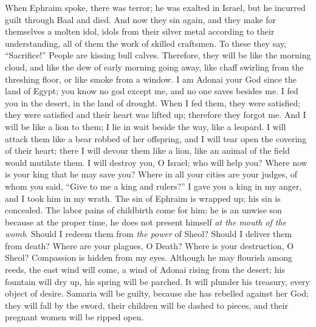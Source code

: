 \begin{biblechapter} %
 When Ephraim spoke, there was terror; 
he was exalted in Israel, 
but he incurred guilt through Baal and died.
\verse And now they sin again, 
and they make for themselves a molten idol, 
idols from their silver metal according to their understanding, 
all of them the work of skilled craftsmen. 
To these they say, “Sacrifice!” 
People are kissing bull calves.
\verse Therefore, they will be like the morning cloud, 
and like the dew of early morning going away, 
like chaff swirling from the threshing floor, 
or like smoke from a window.
\verse I am Adonai your God 
since the land of Egypt; 
you know no god except me, 
and no one saves besides me.
\verse I fed you in the desert, 
in the land of drought.
\verse When I fed them, they were satisfied; 
they were satisfied and their heart was lifted up; 
therefore they forgot me.
\verse And I will be like a lion to them; 
I lie in wait beside the way, like a leopard.
\verse I will attack them like a bear robbed of her offspring, 
and I will tear open the covering of their heart; 
there I will devour them like a lion, 
like an animal of the field would mutilate them.
\verse I will destroy you, O Israel; 
who will help you?
\verse Where now is your king that he may save you? 
Where in all your cities are your judges, 
of whom you said, “Give to 
me a king and rulers?”
\verse I gave you a king in my anger, 
and I took him in my wrath.
\verse The sin of Ephraim is wrapped up; 
his sin is concealed.
\verse The labor pains of childbirth come for him; 
he is an unwise son 
because at the proper time, he does not present himself 
\textit{at the mouth of the womb}.
\verse Should I redeem them from \textit{the power} of Sheol?  
Should I deliver them from death? 
Where are your plagues, O Death? 
Where is your destruction, O Sheol? 
Compassion is hidden from my eyes.
\verse Although he may flourish among reeds, 
the east wind will come, a wind of Adonai 
rising from the desert; 
his fountain will dry up, 
his spring will be parched. 
It will plunder his treasury, 
every object of desire.
\verse  Samaria will be guilty, 
because she has rebelled against her God; 
they will fall by the sword, 
their children will be dashed to pieces, 
and their pregnant women will be ripped open.
\end{biblechapter}

